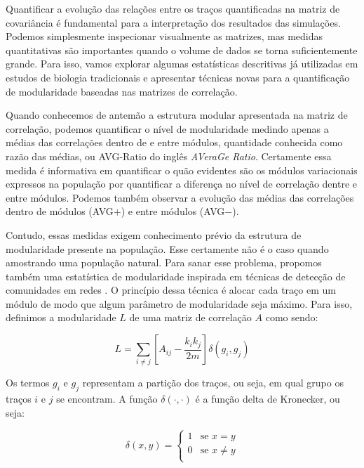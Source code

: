 Quantificar a evolução das relações entre os traços quantificadas na
matriz de covariância é fundamental para a interpretação dos resultados
das simulações. 
Podemos simplesmente inspecionar visualmente as matrizes, mas medidas
quantitativas são importantes quando o volume de dados se torna
suficientemente grande. 
Para isso, vamos explorar algumas estatísticas descritivas já utilizadas em
estudos de biologia tradicionais e apresentar técnicas novas para a
quantificação de modularidade baseadas nas matrizes de correlação. 

Quando conhecemos de antemão a estrutura modular apresentada na matriz
de correlação, podemos quantificar o nível de modularidade medindo
apenas a médias das correlações dentro de e entre módulos, quantidade
conhecida como razão das médias, ou AVG-Ratio do inglês {\it AVeraGe Ratio}. 
Certamente essa medida é informativa em quantificar o quão evidentes são
os módulos variacionais expressos na população por quantificar a
diferença no nível de correlação dentre e entre módulos. 
Podemos também observar a evolução das médias das correlações dentro
de módulos (AVG$+$) e entre módulos (AVG$-$). 

Contudo, essas medidas exigem conhecimento prévio da estrutura de
modularidade presente na população. 
Esse certamente não é o caso quando amostrando uma população natural.
Para sanar esse problema, propomos também uma estatística de
modularidade inspirada em técnicas de detecção de comunidades em redes
\citep{Newman2006,Newman2006a,Reichardt2006}. 
O princípio dessa técnica é alocar cada traço em um módulo de modo que
algum parâmetro de modularidade seja máximo. 
Para isso, definimos a modularidade $L$ de uma matriz de correlação $A$
como sendo:

\begin{equation}
   L = \sum_{i \neq j} \left[ A_{ij} - \frac{k_ik_j}{2m} \right] \delta(g_i, g_j)
\end{equation}

Os termos $g_i$ e $g_j$ representam a partição dos traços, ou seja, em
qual grupo os traços $i$ e $j$ se encontram. 
A função $\delta(\cdot,\cdot)$ é a função delta de Kronecker, ou seja:

\begin{equation}
   \delta (x,y) = \left \{ 
      \begin{array}{rl}
          1 & \text{se } x = y\\
          0 & \text{se } x \neq y\\
      \end{array} \right.
\end{equation}

